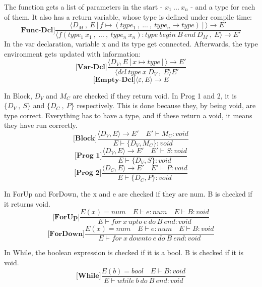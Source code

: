 The function gets a list of parameters in the start - \(x_1\ ...\ x_n\) - and a type for each of them. It also has a return variable, whose type is defined under compile time:
\[\textbf{Func-Dcl]} \frac{\langle D_M\: ,\ E[f \mapsto (type_1\: ,\ ...\: ,\ type_n \rightarrow type)] \rangle \rightarrow E'}{\langle f(type_1\ x_1\: ,\ ...\: ,\ type_n\ x_n):type\ begin\ B\ end\ D_M\: ,\ E \rangle \rightarrow E'}\]
In the var declaration, variable x and its type get connected. Afterwards, the type environment gets updated with information:
\[ \textbf{[Var-Dcl]} \frac{\langle D_V,E[x \mapsto type ]\rangle \rightarrow E'}{\langle dcl\ type\ x\ D_V\: ,\ E \rangle E'}\]
\[\textbf{[Empty-Dcl]} \langle \varepsilon, E \rangle \rightarrow E \]

In Block, \(D_V\) and \(M_C\) are checked if they return void. In Prog 1 and 2, it is \(\{D_V\: ,\ S\}\) and \(\{D_C\: ,\ P\}\) respectively. This is done because they, by being void, are type correct. Everything has to have a type, and if these return a void, it means they have run correctly.
\[\textbf{[Block]} \frac{\langle D_V, E \rangle \rightarrow E' \quad E' \vdash M_C:void}{E \vdash \{D_V,M_C\}:void}\]
\[ \textbf{[Prog 1]} \frac{\langle D_V, E \rangle \rightarrow E' \quad E' \vdash S:void}{E \vdash \{D_V,S\} : void}\]
\[\textbf{[Prog 2]} \frac{\langle D_C, E \rangle \rightarrow E' \quad E' \vdash P:void}{E \vdash \{D_C, P\}:void}\]

In ForUp and ForDown, the x and e are checked if they are num. B is checked if it returns void.
\[\textbf{[ForUp]} \frac{E(x) = num \quad E \vdash e:num \quad E \vdash B:void}{E \vdash for\ x\ upto\ e\ do\ B\ end:void}\]
\[\textbf{[ForDown]} \frac{E(x) = num \quad E \vdash e:num \quad E \vdash B:void}{E \vdash for\ x\ downto\ e\ do\ B\ end:void}\]

In While, the boolean expression is checked if it is a bool. B is checked if it is void.
\[\textbf{[While]} \frac{E(b) = bool \quad E \vdash B:void}{E \vdash while\ b\ do\ B\ end:void}\]